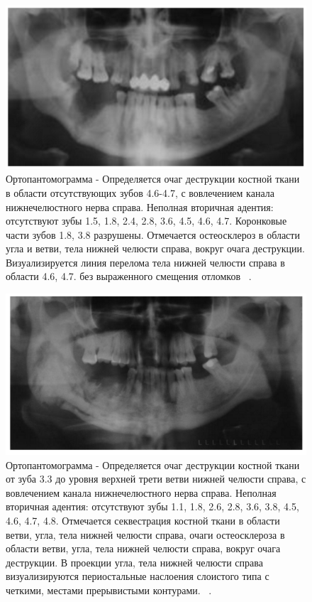 \documentclass[11pt]{article}
\begin{document}
	\begin{figure}[H]
	\centering
	\includegraphics[width=\textwidth]{optg_7}
	\caption{Ортопантомограмма - Определяется очаг деструкции костной ткани в области отсутствующих зубов 4.6-4.7, с вовлечением канала нижнечелюстного нерва справа. Неполная вторичная адентия: отсутствуют зубы 1.5, 1.8, 2.4, 2.8, 3.6, 4.5, 4.6, 4.7.	Коронковые части зубов 1.8, 3.8 разрушены. Отмечается остеосклероз в области угла и ветви, тела нижней челюсти справа, вокруг очага деструкции. Визуализируется линия перелома тела нижней челюсти справа в 
		области 4.6, 4.7. без выраженного смещения отломков ~\cite{rejr}. }
	\label{fig:optg_7}
\end{figure}

	\begin{figure}[H]
	\centering
	\includegraphics[width=\textwidth]{optg_8}
	\caption{Ортопантомограмма - Определяется очаг деструкции костной ткани от зуба 3.3 до уровня верхней трети ветви нижней челюсти справа, с вовлечением канала нижнечелюстного нерва справа. Неполная вторичная адентия: отсутствуют 
		зубы 1.1, 1.8, 2.6, 2.8, 3.6, 3.8, 4.5, 4.6, 4.7, 4.8. Отмечается секвестрация костной ткани в области ветви, угла, тела нижней челюсти справа, очаги остеосклероза в области ветви, угла, тела нижней челюсти справа, вокруг 
		очага деструкции. В проекции угла, тела нижней челюсти справа визуализируются периостальные наслоения слоистого типа с четкими, местами прерывистыми контурами.  ~\cite{rejr}. }
	\label{fig:optg_8}
	\end{figure}
\end{document}
